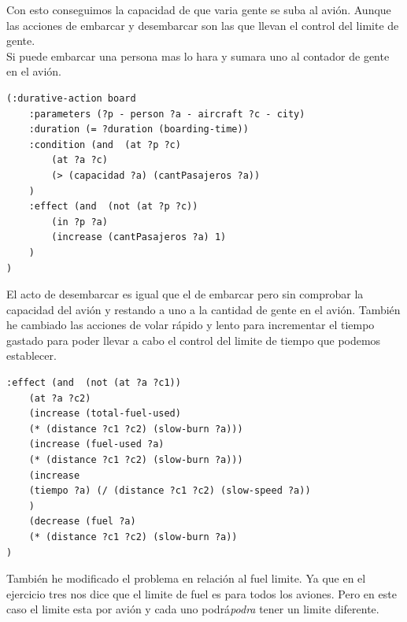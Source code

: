 \documentclass[12pt,a4paper]{article}
\begin{document}
Con esto conseguimos la capacidad de que varia gente se suba al avión. Aunque las acciones de embarcar y desembarcar son las que llevan el control del limite de gente. \\Si puede embarcar una persona mas lo hara y sumara uno al contador de gente en el avión. 
\begin{lstlisting}
(:durative-action board
	:parameters (?p - person ?a - aircraft ?c - city)
	:duration (= ?duration (boarding-time))
	:condition (and  (at ?p ?c)
		(at ?a ?c)
		(> (capacidad ?a) (cantPasajeros ?a))
	)
	:effect (and  (not (at ?p ?c))
		(in ?p ?a)
		(increase (cantPasajeros ?a) 1)
	)
)
\end{lstlisting}
El acto de desembarcar es igual que el de embarcar pero sin comprobar la capacidad del avión y restando a uno a la cantidad de gente en el avión. También he cambiado las acciones de volar rápido y lento para incrementar el tiempo gastado para poder llevar a cabo el control del limite de tiempo que podemos establecer. 
\begin{lstlisting}
:effect (and  (not (at ?a ?c1))
	(at ?a ?c2)
	(increase (total-fuel-used)
	(* (distance ?c1 ?c2) (slow-burn ?a)))
	(increase (fuel-used ?a)
	(* (distance ?c1 ?c2) (slow-burn ?a)))
	(increase
	(tiempo ?a) (/ (distance ?c1 ?c2) (slow-speed ?a))
	)  
	(decrease (fuel ?a) 
	(* (distance ?c1 ?c2) (slow-burn ?a))
)
\end{lstlisting}
También he modificado el problema en relación al fuel limite. Ya que en el ejercicio tres nos dice que el limite de fuel es para todos los aviones. Pero en este caso el limite esta por avión y cada uno podrá\textit{podra} tener un limite diferente. 
\end{document}

